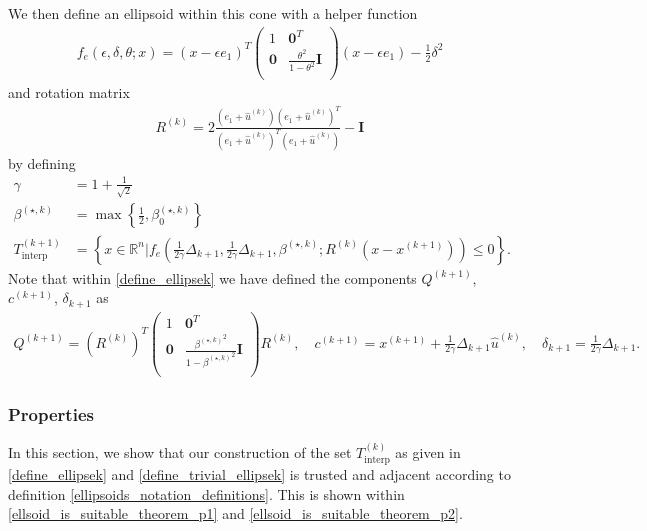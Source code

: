 \documentclass{article}
\theoremstyle{case}
\numberwithin{theorem}{subsection}
\newcommand{\bs}{{\beta^{(\star, k)}}}
\newcommand{\bsk}{{\beta_0^{(\star, k)}}}
\newcommand{\dkpo}{\Delta_{k+1}}
\newcommand{\huk}{{{\hat u}^{(k)}}}
\newcommand{\Rn}{\mathbb R^n}
\newcommand{\rotk}{{R^{(k)}}}
\newcommand{\sampletrk}{{T_{\text{interp}}^{(k)}}}
\newcommand{\sampletrkpo}{{T_{\text{interp}}^{(k+1)}}}
\newcommand{\xkpo}{{{x}^{(k+1)}}}
\newcommand{\qkpo}{{Q^{(k+1)}}}
\newcommand{\ckpo}{{c^{(k+1)}}}
\newcommand{\sdkpo}{{\delta_{k+1}}}
\begin{document}
We then define an ellipsoid within this cone with a helper function
\begin{align}
f_e(\epsilon, \delta, \theta; x) = (x - \epsilon e_1)^T\begin{pmatrix}
1 & \boldsymbol0^T \\
\boldsymbol 0 & \frac{\theta^2}{1 - \theta^2} \boldsymbol I \\
\end{pmatrix}(x - \epsilon e_1) - \frac 1 2 \delta^2 \label{define_ellipse_function}
\end{align}
and rotation matrix
\begin{align}
\rotk = 2\frac{(e_1 + \huk)(e_1 + \huk)^T}{(e_1 + \huk)^T(e_1 + \huk)} - \boldsymbol I \label{define_rotation}
\end{align}
by defining
\begin{align}
\gamma &= 1 + \frac 1 {\sqrt{2}} \label{define_the_constant_gamma} \\
\bs &= \max\left\{\frac 1 2 , \bsk\right\} \label{define_bs} \\
\sampletrkpo &= \left\{x \in \Rn | f_e\left(\frac 1 {2\gamma} \dkpo, \frac 1 {2\gamma} \dkpo,\bs; \rotk(x - \xkpo)\right) \le 0\right\}. \label{define_ellipsek}
\end{align}
Note that within \cref{define_ellipsek} we have defined the components $\qkpo$, $\ckpo$, $\sdkpo$ as
\begin{align}
\qkpo = \left(\rotk\right)^T \begin{pmatrix}
1 & \boldsymbol0^T \\
\boldsymbol 0 & \frac{\bs^2}{1 - \bs^2} \boldsymbol I \\
\end{pmatrix} \rotk, \quad
\ckpo = \xkpo + \frac 1 {2\gamma} \dkpo \huk, \quad
\sdkpo = \frac 1 {2\gamma} \dkpo. \label{conservative_ellipsoid_details}
\end{align}


\subsubsection{Properties}
\label{feasible_ellipsoid_analysis}

In this section, we show that our construction of the set $\sampletrk$ as given in 
\cref{define_ellipsek} and \cref{define_trivial_ellipsek}
is trusted and adjacent according to definition \cref{ellipsoids_notation_definitions}.
This is shown within \cref{ellsoid_is_suitable_theorem_p1} and \cref{ellsoid_is_suitable_theorem_p2}.
\end{document}
